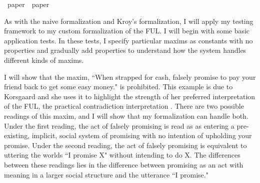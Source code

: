 %
\begin{isabellebody}%
%
%
\isadelimtheory
%
\endisadelimtheory
%
\isatagtheory
{}\isamarkupfalse%
\ paper{}{}{}\ \ paper{}{}\isanewline
\isanewline
{}%
\endisatagtheory
{\isafoldtheory}%
%
\isadelimtheory
%
\endisadelimtheory
%
\isadelimdocument
%
\endisadelimdocument
%
\isatagdocument
%
\isamarkuptrue%
%
\endisatagdocument
{\isafolddocument}%
%
\isadelimdocument
%
\endisadelimdocument
%
\begin{isamarkuptext}%
As with the naive formalization and Kroy's formalization, I will apply my testing framework to 
my custom formalization of the FUL. I will begin with some basic application tests. In these tests, 
I specify particular maxims as constants with no properties and gradually add properties to understand 
how the system handles different kinds of maxims.%
\end{isamarkuptext}\isamarkuptrue%
%
\begin{isamarkuptext}%
I will show that the maxim, ``When strapped for cash, falsely promise to pay your friend back
to get some easy money." is prohibited. This example is due to Korsgaard and she uses it to highlight 
the strength of her preferred interpretation of the FUL, the practical contradiction interpretation \cite{KorsgaardFUL}.
There are two possible readings of this maxim, and I will show that my formalization can handle both. 
Under the first reading, the act of falsely promising is read as
as entering a pre-existing, implicit, social system of promising with no intention of upholding your 
promise. Under the second reading, the act of falsely promising is equivalent to uttering the worlds 
``I promise X" without intending to do X. The differences between these readings lies in the difference 
between promising as an act with meaning in a larger social structure and the utterance ``I promise."


\end{isamarkuptext}
\end{isabellebody}
